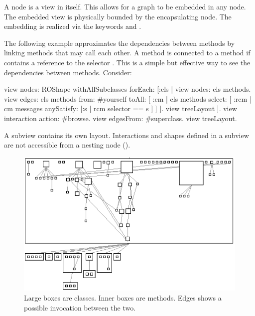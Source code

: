 \documentclass[a4paper,10pt,twoside]{book}
\begin{document}
A node is a view in itself. This allows for a graph to be embedded in any node. The embedded view is physically bounded by the encapsulating node. The embedding is realized via the keywords  and . 

The following example approximates the dependencies between methods by linking methods that may call each other. A method  is connected to a method  if  contains a reference to the selector . This is a simple but effective way to see the dependencies between methods. Consider:

\begin{code}{}
view nodes: ROShape withAllSubclasses forEach: [:cls |
	view nodes: cls methods.
	view edges: cls methods from: #yourself toAll: [ :cm | cls methods select: [ :rcm |  cm messages anySatisfy: [:s | rcm selector == s ] ] ].
	view treeLayout
].
view interaction action: #browse.
view edgesFrom: #superclass.
view treeLayout.
\end{code}

A subview contains its own layout. Interactions and shapes defined in a subview are not accessible from a nesting node (). 



\begin{figure}[htbp]
\centerline{\includegraphics[width=0.6\linewidth]{methodDependencies.png}}
\caption{Large boxes are classes. Inner boxes are methods. Edges shows a possible invocation between the two.}
\label{fig:abstractClasses3}
\end{figure}
\end{document}
